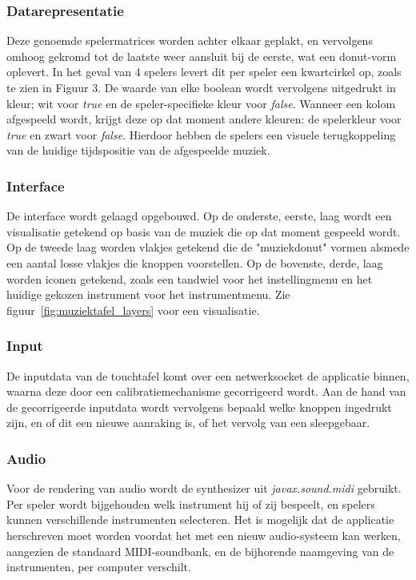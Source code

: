 \documentclass{acm}
\begin{document}
\subsubsection{Datarepresentatie}
Deze genoemde spelermatrices worden achter elkaar geplakt, en vervolgens omhoog gekromd tot de laatste weer aansluit bij de eerste, wat een donut-vorm oplevert. In het geval van 4 spelers levert dit per speler een kwartcirkel op, zoals te zien in Figuur 3. De waarde van elke boolean wordt vervolgens uitgedrukt in kleur; wit voor \textit{true} en de speler-specifieke kleur voor \textit{false}. Wanneer een kolom afgespeeld wordt, krijgt deze op dat moment andere kleuren: de spelerkleur voor \textit{true} en zwart voor \textit{false}. Hierdoor hebben de spelers een visuele terugkoppeling van de huidige tijdspositie van de afgespeelde muziek.

\subsubsection{Interface}
De interface wordt gelaagd opgebouwd. Op de onderste, eerste, laag wordt een visualisatie getekend op basis van de muziek die op dat moment gespeeld wordt. Op de tweede laag worden vlakjes getekend die de "muziekdonut" vormen alsmede een aantal losse vlakjes die knoppen voorstellen. Op de bovenste, derde, laag worden iconen getekend, zoals een tandwiel voor het instellingmenu en het huidige gekozen instrument voor het instrumentmenu. Zie figuur~\ref{fig:muziektafel_layers} voor een visualisatie.

\subsubsection{Input}
De inputdata van de touchtafel komt over een netwerksocket de applicatie binnen, waarna deze door een calibratiemechanisme gecorrigeerd wordt. Aan de hand van de gecorrigeerde inputdata wordt vervolgens bepaald welke knoppen ingedrukt zijn, en of dit een nieuwe aanraking is, of het vervolg van een sleepgebaar.

\subsubsection{Audio}
Voor de rendering van audio wordt de synthesizer uit \textit{javax.sound.midi} gebruikt. Per speler wordt bijgehouden welk instrument hij of zij bespeelt, en spelers kunnen verschillende instrumenten selecteren. Het is mogelijk dat de applicatie herschreven moet worden voordat het met een nieuw audio-systeem kan werken, aangezien de standaard MIDI-soundbank, en de bijhorende naamgeving van de instrumenten, per computer verschilt.
\end{document}
